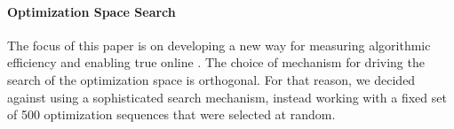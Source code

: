 \paragraph{Optimization Space Search}

The focus of this paper is on developing a new way for measuring algorithmic efficiency and enabling true online {\itercomp}. The choice of
mechanism for driving the search of the optimization space is orthogonal. For that reason, we decided against using a sophisticated search
mechanism, instead working with a fixed set of 500 optimization sequences that were selected at random. 





